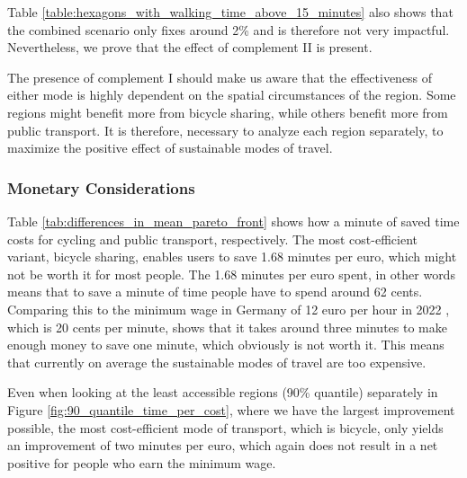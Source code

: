 Table \ref{table:hexagons_with_walking_time_above_15_minutes} also shows that the combined scenario only fixes around 2\% and is therefore not very impactful.
Nevertheless, we prove that the effect of complement II is present.

The presence of complement I should make us aware that the effectiveness of either mode is highly dependent on the spatial circumstances of the region.
Some regions might benefit more from bicycle sharing, while others benefit more from public transport.
It is therefore, necessary to analyze each region separately, to maximize the positive effect of sustainable modes of travel.





\subsubsection{Monetary Considerations}

Table \ref{tab:differences_in_mean_pareto_front} shows how a minute of saved time costs for cycling and public transport, respectively.
The most cost-efficient variant, bicycle sharing, enables users to save 1.68 minutes per euro, which might not be worth it for most people.
The 1.68 minutes per euro spent, in other words means that to save a minute of time people have to spend around 62 cents.
Comparing this to the minimum wage in Germany of 12 euro per hour in 2022 , which is 20 cents per minute, shows that it takes around three minutes to make enough money to save one minute, which obviously is not worth it.
This means that currently on average the sustainable modes of travel are too expensive.

Even when looking at the least accessible regions (90\% quantile) separately in Figure \ref{fig:90_quantile_time_per_cost}, where we have the largest improvement possible, the most cost-efficient mode of transport, which is bicycle, only yields an improvement of two minutes per euro, which again does not result in a net positive for people who earn the minimum wage.


